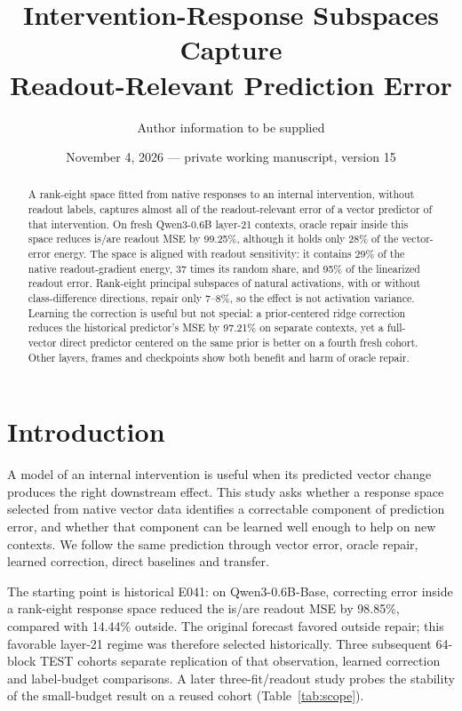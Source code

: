 \documentclass[11pt]{article}
\title{Intervention-Response Subspaces Capture\\Readout-Relevant Prediction Error}
\author{Author information to be supplied}
\date{November 4, 2026 --- private working manuscript, version 15}
\begin{document}
\maketitle
\begin{abstract}
A rank-eight space fitted from native responses to an internal intervention, without readout labels, captures almost all of the readout-relevant error of a vector predictor of that intervention. On fresh Qwen3-0.6B layer-21 contexts, oracle repair inside this space reduces is/are readout MSE by 99.25\%, although it holds only 28\% of the vector-error energy. The space is aligned with readout sensitivity: it contains 29\% of the native readout-gradient energy, 37 times its random share, and 95\% of the linearized readout error. Rank-eight principal subspaces of natural activations, with or without class-difference directions, repair only 7--8\%, so the effect is not activation variance. Learning the correction is useful but not special: a prior-centered ridge correction reduces the historical predictor's MSE by 97.21\% on separate contexts, yet a full-vector direct predictor centered on the same prior is better on a fourth fresh cohort. Other layers, frames and checkpoints show both benefit and harm of oracle repair.
\end{abstract}

\section{Introduction}
A model of an internal intervention is useful when its predicted vector change produces the right downstream effect. This study asks whether a response space selected from native vector data identifies a correctable component of prediction error, and whether that component can be learned well enough to help on new contexts. We follow the same prediction through vector error, oracle repair, learned correction, direct baselines and transfer.

The starting point is historical E041: on Qwen3-0.6B-Base, correcting error inside a rank-eight response space reduced the is/are readout MSE by 98.85\%, compared with 14.44\% outside. The original forecast favored outside repair; this favorable layer-21 regime was therefore selected historically. Three subsequent 64-block TEST cohorts separate replication of that observation, learned correction and label-budget comparisons. A later three-fit/readout study probes the stability of the small-budget result on a reused cohort (Table~\ref{tab:scope}).
\end{document}
